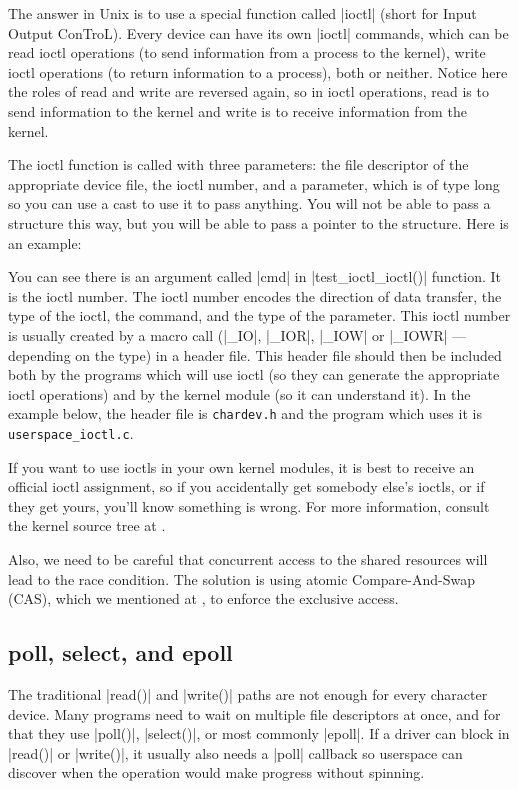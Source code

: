 \documentclass[10pt, oneside]{book}
\begin{document}
The answer in Unix is to use a special function called \cpp|ioctl| (short for Input Output ConTroL).
Every device can have its own \cpp|ioctl| commands, which can be read ioctl operations (to send information from a process to the kernel), write ioctl operations (to return information to a process), both or neither.
Notice here the roles of read and write are reversed again, so in ioctl operations, read is to send information to the kernel and write is to receive information from the kernel.

The ioctl function is called with three parameters: the file descriptor of the appropriate device file, the ioctl number, and a parameter, which is of type long so you can use a cast to use it to pass anything.
You will not be able to pass a structure this way, but you will be able to pass a pointer to the structure.
Here is an example:


You can see there is an argument called \cpp|cmd| in \cpp|test_ioctl_ioctl()| function.
It is the ioctl number.
The ioctl number encodes the direction of data transfer, the type of the ioctl, the command, and the type of the parameter.
This ioctl number is usually created by a macro call (\cpp|_IO|, \cpp|_IOR|, \cpp|_IOW| or \cpp|_IOWR| --- depending on the type) in a header file.
This header file should then be included both by the programs which will use ioctl (so they can generate the appropriate ioctl operations) and by the kernel module (so it can understand it).
In the example below, the header file is \verb|chardev.h| and the program which uses it is \verb|userspace_ioctl.c|.

If you want to use ioctls in your own kernel modules, it is best to receive an official ioctl assignment, so if you accidentally get somebody else's ioctls, or if they get yours, you'll know something is wrong.
For more information, consult the kernel source tree at .

Also, we need to be careful that concurrent access to the shared resources will lead to the race condition.
The solution is using atomic Compare-And-Swap (CAS), which we mentioned at , to enforce the exclusive access.




\subsection{poll, select, and epoll}
\label{sec:poll_select_epoll}
The traditional \cpp|read()| and \cpp|write()| paths are not enough for every
character device.
Many programs need to wait on multiple file descriptors at once, and for that
they use \cpp|poll()|, \cpp|select()|, or most commonly \cpp|epoll|.
If a driver can block in \cpp|read()| or \cpp|write()|, it usually also needs a
\cpp|poll| callback so userspace can discover when the operation would make
progress without spinning.
\end{document}
